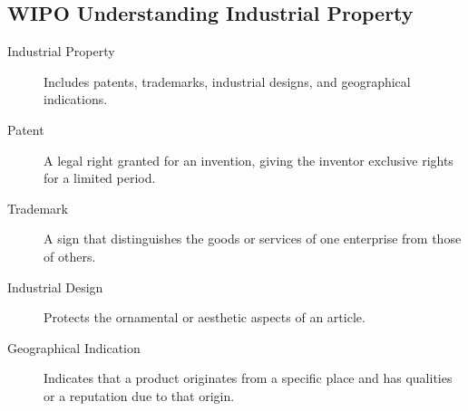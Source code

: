 \documentclass{article}
\begin{document}
\subsection{WIPO Understanding Industrial Property}

\begin{description}
  \item[Industrial Property] Includes patents, trademarks, industrial designs, and geographical indications.
  \item[Patent] A legal right granted for an invention, giving the inventor exclusive rights for a limited period.
  \item[Trademark] A sign that distinguishes the goods or services of one enterprise from those of others.
  \item[Industrial Design] Protects the ornamental or aesthetic aspects of an article.
  \item[Geographical Indication] Indicates that a product originates from a specific place and has qualities or a reputation due to that origin.
\end{description}
\end{document}
